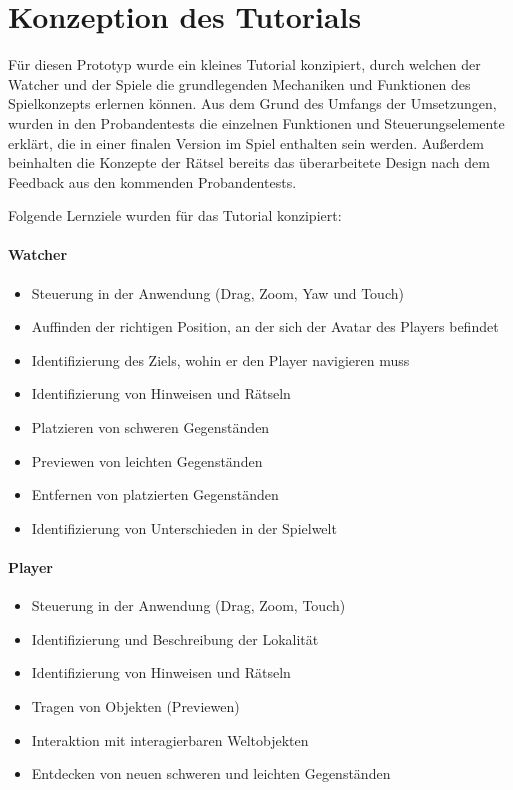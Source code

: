 \section{Konzeption des Tutorials}

Für diesen Prototyp wurde ein kleines Tutorial konzipiert, durch welchen der Watcher und der Spiele die grundlegenden Mechaniken und Funktionen des Spielkonzepts erlernen können. Aus dem Grund des Umfangs der Umsetzungen, wurden in den Probandentests die einzelnen Funktionen und Steuerungselemente erklärt, die in einer finalen Version im Spiel enthalten sein werden. Außerdem beinhalten die Konzepte der Rätsel bereits das überarbeitete Design nach dem Feedback aus den kommenden Probandentests.

Folgende Lernziele wurden für das Tutorial konzipiert:
\paragraph{Watcher}
\begin{itemize}
    \item Steuerung in der Anwendung (Drag, Zoom, Yaw und Touch)
    \item Auffinden der richtigen Position, an der sich der Avatar des Players befindet 
    \item Identifizierung des Ziels, wohin er den Player navigieren muss
    \item Identifizierung von Hinweisen und Rätseln
    \item Platzieren von schweren Gegenständen
    \item Previewen von leichten Gegenständen
    \item Entfernen von platzierten Gegenständen
    \item Identifizierung von Unterschieden in der Spielwelt
\end{itemize}

\paragraph{Player}

\begin{itemize}
    \item Steuerung in der Anwendung (Drag, Zoom, Touch)
    \item Identifizierung und Beschreibung der Lokalität
    \item Identifizierung von Hinweisen und Rätseln
    \item Tragen von Objekten (Previewen)
    \item Interaktion mit interagierbaren Weltobjekten
    \item Entdecken von neuen schweren und leichten Gegenständen
\end{itemize}

